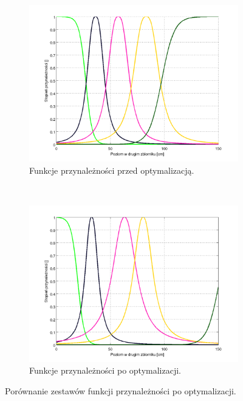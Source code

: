 \documentclass[a4paper,12pt]{article}
\begin{document}
\begin{figure}[h]
   \centering
   \begin{subfigure}[h]{0.45\textwidth}
      \includegraphics[width=\textwidth]{img/optimization_mfs_1.png}
      \caption{Funkcje przynależności przed optymalizacją.}
   \end{subfigure}
   \\
   \begin{subfigure}[h]{0.45\textwidth}
      \includegraphics[width=\textwidth]{img/optimization_mfs_2.png}
      \caption{Funkcje przynależności po optymalizacji.}
   \end{subfigure}
   \caption{Porównanie zestawów funkcji przynależności po optymalizacji.}
   \label{img:optimized_mfs}
\end{figure}
\end{document}
